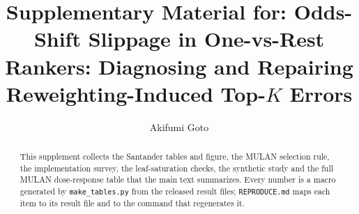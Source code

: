 \documentclass[sigconf,nonacm]{acmart}
\begin{document}
\title{Supplementary Material for: Odds-Shift Slippage in One-vs-Rest Rankers: Diagnosing and Repairing Reweighting-Induced Top-$K$ Errors}

\author{Akifumi Goto}

\begin{abstract}
This supplement collects the Santander tables and figure, the MULAN selection rule, the implementation survey, the leaf-saturation checks, the synthetic study and the full MULAN dose-response table that the main text summarizes. Every number is a macro generated by \texttt{make\_tables.py} from the released result files; \texttt{REPRODUCE.md} maps each item to its result file and to the command that regenerates it.
\end{abstract}
\maketitle
\end{document}
